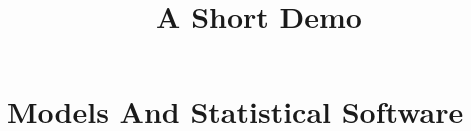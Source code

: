 \documentclass[article]{jss}
\title{A Short Demo}
\begin{document}
\section{Models And Statistical Software}
\end{document}
